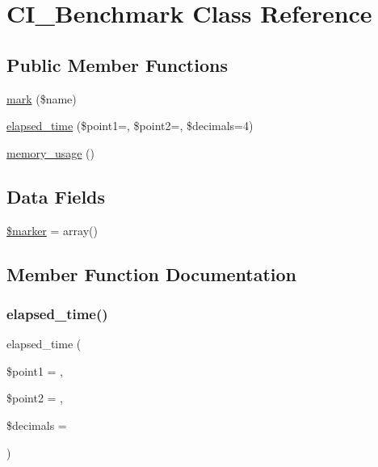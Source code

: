 \hypertarget{class_c_i___benchmark}{}\section{C\+I\+\_\+\+Benchmark Class Reference}
\label{class_c_i___benchmark}
\subsection*{Public Member Functions}
\begin{DoxyCompactItemize}
\item 
\mbox{\hyperlink{class_c_i___benchmark_a18c82f5dd0118d3e7c57bcd86dc32e9e}{mark}} (\$name)
\item 
\mbox{\hyperlink{class_c_i___benchmark_acfe5ce040b92f677e01b5dcc9cdcc3bf}{elapsed\+\_\+time}} (\$point1=\textquotesingle{}\textquotesingle{}, \$point2=\textquotesingle{}\textquotesingle{}, \$decimals=4)
\item 
\mbox{\hyperlink{class_c_i___benchmark_abdb10dca75c4c15f94796af1602d5b80}{memory\+\_\+usage}} ()
\end{DoxyCompactItemize}
\subsection*{Data Fields}
\begin{DoxyCompactItemize}
\item 
\mbox{\hyperlink{class_c_i___benchmark_aad34fbf53cda6bd8a3a9c46764d534fa}{\$marker}} = array()
\end{DoxyCompactItemize}


\subsection{Member Function Documentation}
\mbox{\label{class_c_i___benchmark_acfe5ce040b92f677e01b5dcc9cdcc3bf}} 
\subsubsection{\texorpdfstring{elapsed\+\_\+time()}{elapsed\_time()}}
{\footnotesize\ttfamily elapsed\+\_\+time (\begin{DoxyParamCaption}\item[{}]{\$point1 = {\ttfamily \textquotesingle{}\textquotesingle{}},  }\item[{}]{\$point2 = {\ttfamily \textquotesingle{}\textquotesingle{}},  }\item[{}]{\$decimals = {} }\end{DoxyParamCaption})}

